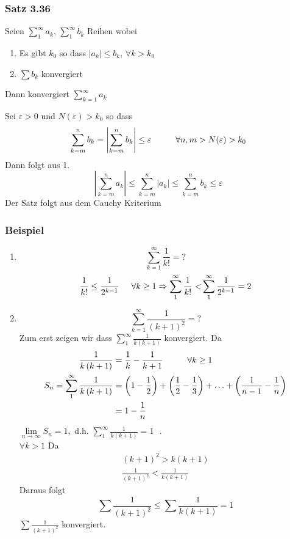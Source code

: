\subsubsection*{Satz 3.36}
Seien $\sum\limits_1^\infty  {{a_k}} $, $\sum\limits_1^\infty  {{b_k}} $ Reihen wobei 
\begin{enumerate}
\item Es gibt $k_0$ so dass $\left| a_k\right| \leq b_k$, $\forall k > k_0$ 
\item $\sum b_k$ konvergiert
\end{enumerate}
Dann konvergiert $\sum\limits_{k = 1}^\infty  {{a_k}} $

\begin{beweis}{}
Sei $\varepsilon>0$ und $N(\varepsilon) > k_0$ so dass 
\[\sum\limits_{k = m}^n {{b_k}}  = \left| {\sum\limits_{k = m}^n {{b_k}} } \right| \le \varepsilon\hspace{10mm} \forall n,m > N(\varepsilon ) > {k_0}\]
Dann folgt aus 1. 
\[\left| {\sum\limits_{k = m}^n {{a_k}} } \right| \le \sum\limits_{k = m}^n {\left| {{a_k}} \right|}  \le \sum\limits_{k = m}^n {{b_k}}  \le \varepsilon \]
Der Satz folgt aus dem Cauchy Kriterium
\end{beweis}
\subsubsection*{Beispiel}
\begin{enumerate}
\item \[\sum\limits_{k = 1}^\infty  {\frac{1}{{k!}} = ?} \]
\[\frac{1}{{k!}} \le \frac{1}{{{2^{k - 1}}}}\hspace{5mm}\forall k \ge 1 \Rightarrow \sum\limits_1^\infty  {\frac{1}{{k!}} < } \sum\limits_1^\infty  {\frac{1}{{{2^{k - 1}}}}}  = 2\]
\item \[\sum\limits_{k = 1}^\infty  {\frac{1}{{{{\left( {k + 1} \right)}^2}}} = ?} \]
Zum erst zeigen wir dass $\sum\limits_1^\infty  {\frac{1}{{k\left( {k + 1} \right)}}} $ konvergiert. Da 
\begin{align*}
\frac{1}{{k\left( {k + 1} \right)}}&= \frac{1}{k} - \frac{1}{{k + 1}}\hspace{10mm}\forall k \ge 1\\
{S_n} = \sum\limits_1^\infty  {\frac{1}{{k\left( {k + 1} \right)}}} &= \left( {1 - \frac{1}{2}} \right) + \left( {\frac{1}{2} - \frac{1}{3}} \right) +  \ldots  + \left( {\frac{1}{{n - 1}} - \frac{1}{n}} \right)\\
&= 1 - \frac{1}{n}
\end{align*}
$\mathop {\lim }\limits_{n \to \infty } {S_n} = 1,{\text{ d.h. }}\sum\limits_1^\infty  {\frac{1}{{k\left( {k + 1} \right)}} = 1} {\text{ }}$.\\
$\forall k > 1$ Da 
\begin{align*}
{\left( {k + 1} \right)^2} > k\left( {k + 1} \right)\\
\frac{1}{{{{\left( {k + 1} \right)}^2}}} < \frac{1}{{k\left( {k + 1} \right)}}
\end{align*}
Daraus folgt 
\[\sum {\frac{1}{{{{\left( {k + 1} \right)}^2}}}}  \le \sum {\frac{1}{{k\left( {k + 1} \right)}}}  = 1\]
$\sum {\frac{1}{{{{\left( {k + 1} \right)}^2}}}} $ konvergiert.
\end{enumerate}

